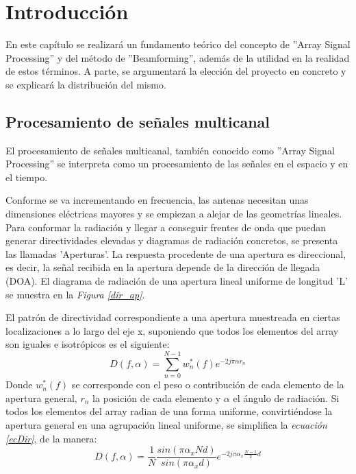 \documentclass[a4paper,11pt]{book}
\begin{document}


\frontmatter
\tableofcontents
%
\mainmatter
\setlength{\parskip}{5pt}

\chapter{Introducción}
En este capítulo se realizará un fundamento teórico del concepto de ''Array Signal Processing'' y del método de ''Beamforming'', además de la utilidad en la realidad de estos términos. A parte, se argumentará la elección del proyecto en concreto y se explicará la distribución del mismo.
	\section{Procesamiento de señales multicanal}
	El procesamiento de señales multicanal, también conocido como ''Array Signal Processing'' se interpreta como un procesamiento de las señales en el espacio y en el tiempo.
	
	Conforme se va incrementando en frecuencia, las antenas necesitan unas dimensiones eléctricas mayores y se empiezan a alejar de las geometrías lineales. Para conformar la radiación y llegar a conseguir frentes de onda que puedan generar directividades elevadas y diagramas de radiación concretos, se presenta las llamadas 'Aperturas'. La respuesta procedente de una apertura es direccional, es decir, la señal recibida en la apertura depende de la dirección de llegada (DOA). El diagrama de radiación de una apertura lineal uniforme de longitud 'L' se muestra en la \textit{Figura \ref{dir_ap}}.
	
	El patrón de directividad correspondiente a una apertura muestreada en ciertas localizaciones a lo largo del eje x, suponiendo que todos los elementos del array son iguales e isotrópicos es el siguiente:
	\begin{equation}
	 D(f, \alpha) = \sum_{n = 0}^{N-1}w^{*}_{n}(f)e^{-2j \pi \alpha r_{n}}
	 \label{ecDir}
	\end{equation}
	Donde $w^{*}_{n}(f)$ se corresponde con el peso o contribución de cada elemento de la apertura general, $r_{n}$ la posición de cada elemento y $\alpha$ el ángulo de radiación. Si todos los elementos del array radian de una forma uniforme, convirtiéndose la apertura general en una agrupación lineal uniforme, se simplifica la \textit{ecuación \ref{ecDir}}, de la manera:
	\begin{equation}
		 D(f, \alpha) =\frac{1}{N}\frac{sin(\pi \alpha_{x} N d)}{sin(\pi \alpha_{x} d)} e^{-2j \pi \alpha_{x} \frac{N-1}{2} d}
	\end{equation}
	
\end{document}

